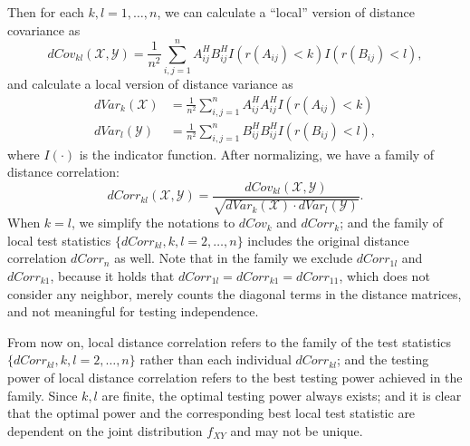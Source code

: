 \documentclass[11pt]{article}
\begin{document}
Then for each $k,l=1,\ldots,n$, we can calculate a ``local'' version of distance covariance as
\begin{equation}
\label{localdCovEqu}
dCov_{kl}(\mathcal{X},\mathcal{Y})=\frac{1}{n^2}\sum_{i,j=1}^{n}A^{H}_{ij}B^{H}_{ij}I(r(A_{ij})<k)I(r(B_{ij})<l),
\end{equation}
and calculate a local version of distance variance as
\begin{align*}
dVar_{k}(\mathcal{X}) &=\frac{1}{n^2}\sum_{i,j=1}^{n}A^{H}_{ij}A^{H}_{ij}I(r(A_{ij})<k)\\
dVar_{l}(\mathcal{Y}) &=\frac{1}{n^2}\sum_{i,j=1}^{n}B^{H}_{ij}B^{H}_{ij}I(r(B_{ij})<l),
\end{align*}
where $I(\cdot)$ is the indicator function. After normalizing, we have a family of distance correlation:
\begin{equation}
\label{localdCorrEqu}
dCorr_{kl}(\mathcal{X},\mathcal{Y})=\frac{dCov_{kl}(\mathcal{X},\mathcal{Y})}{\sqrt{dVar_{k}(\mathcal{X}) \cdot dVar_{l}(\mathcal{Y})}}.
\end{equation}
When $k=l$, we simplify the notations to $dCov_{k}$ and $dCorr_{k}$; and the family of local test statistics $\{dCorr_{kl}, k,l=2,\ldots,n\}$ includes the original distance correlation $dCorr_{n}$ as well. Note that in the family we exclude $dCorr_{1l}$ and $dCorr_{k1}$, because it holds that $dCorr_{1l}=dCorr_{k1}=dCorr_{11}$, which does not consider any neighbor, merely counts the diagonal terms in the distance matrices, and not meaningful for testing independence.

From now on, local distance correlation refers to the family of the test statistics $\{dCorr_{kl}, k,l=2,\ldots,n\}$ rather than each individual $dCorr_{kl}$; and the testing power of local distance correlation refers to the best testing power achieved in the family. Since $k,l$ are finite, the optimal testing power always exists; and it is clear that the optimal power and the corresponding best local test statistic are dependent on the joint distribution $f_{XY}$ and may not be unique.
\end{document}
